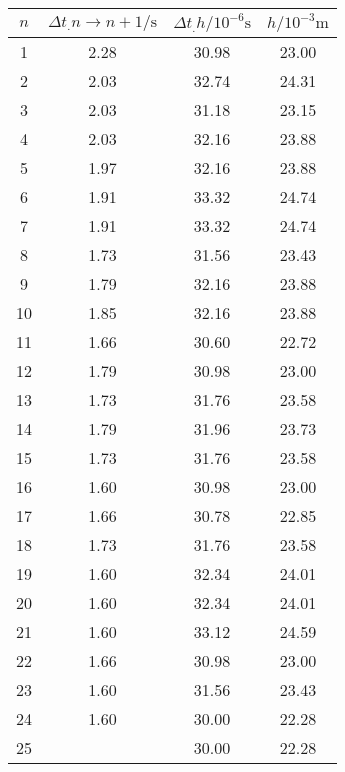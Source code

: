 \label{tab:tabTMScan}
	\begin{tabular}{S[table-format=1.0]S[table-format=1.2]S[table-format=2.2]S[table-format=2.2]}
		\toprule
		{$n$} & {$\Delta t_.{n\rightarrow n+1}/\si{\second}$} &{$\Delta t_.{h}/10^{-6}\si{\second}$} & {$h/10^{-3}\si{\metre}$} \\
		 & 2.28 & 30.98 & 23.00 \\
		2 & 2.03 & 32.74 & 24.31 \\
		3 & 2.03 & 31.18 & 23.15 \\
		4 & 2.03 & 32.16 & 23.88 \\
		5 & 1.97 & 32.16 & 23.88 \\
		6 & 1.91 & 33.32 & 24.74 \\
		7 & 1.91 & 33.32 & 24.74 \\
		8 & 1.73 & 31.56 & 23.43 \\
		9 & 1.79 & 32.16 & 23.88 \\
		10 & 1.85 & 32.16 & 23.88 \\
		11 & 1.66 & 30.60 & 22.72 \\
		12 & 1.79 & 30.98 & 23.00 \\
		13 & 1.73 & 31.76 & 23.58 \\
		14 & 1.79 & 31.96 & 23.73 \\
		15 & 1.73 & 31.76 & 23.58 \\
		16 & 1.60 & 30.98 & 23.00 \\
		17 & 1.66 & 30.78 & 22.85 \\
		18 & 1.73 & 31.76 & 23.58 \\
		19 & 1.60 & 32.34 & 24.01 \\
		20 & 1.60 & 32.34 & 24.01 \\
		21 & 1.60 & 33.12 & 24.59 \\
		22 & 1.66 & 30.98 & 23.00 \\
		23 & 1.60 & 31.56 & 23.43 \\
		24 & 1.60 & 30.00 & 22.28 \\
		25 &  & 30.00 & 22.28 \\
		\bottomrule
	\end{tabular}
